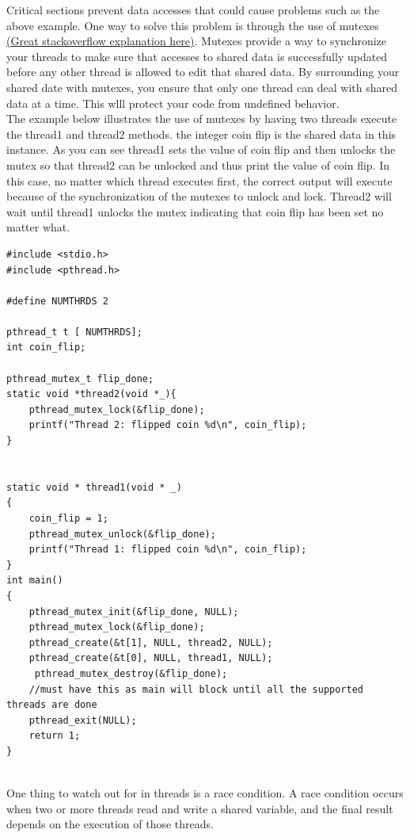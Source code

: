 Critical sections prevent data accesses that could cause problems such as the above example.  One way to solve this problem is through the use of mutexes \href{http://stackoverflow.com/questions/34524/what-is-a-mutex
}{(Great stackoverflow explanation here)}.  Mutexes provide a way to synchronize your threads to make sure that accesses to shared data is successfully updated before any other thread is allowed to edit that shared data.  By surrounding your shared date with mutexes, you ensure that only one thread can deal with shared data at a time.  This wlll protect your code from undefined behavior.\\

The example below illustrates the use of mutexes by having two threads execute the thread1 and thread2 methods.  the integer coin flip is the shared data in this instance.  As you can see thread1 sets the value of coin flip and then unlocks the mutex so that thread2 can be unlocked and thus print the value of coin flip.  In this case, no matter which thread executes first, the correct output will execute because of the synchronization of the mutexes to unlock and lock.  Thread2 will wait until thread1 unlocks the mutex indicating that coin flip has been set no matter what.

\begin{lstlisting}
#include <stdio.h>
#include <pthread.h>

#define NUMTHRDS 2

pthread_t t [ NUMTHRDS];
int coin_flip;

pthread_mutex_t flip_done;
static void *thread2(void *_){
	pthread_mutex_lock(&flip_done);
	printf("Thread 2: flipped coin %d\n", coin_flip);
}


static void * thread1(void * _)
{
	coin_flip = 1;
	pthread_mutex_unlock(&flip_done);
	printf("Thread 1: flipped coin %d\n", coin_flip);
}
int main()
{
	pthread_mutex_init(&flip_done, NULL);
	pthread_mutex_lock(&flip_done);
	pthread_create(&t[1], NULL, thread2, NULL);
	pthread_create(&t[0], NULL, thread1, NULL);
	 pthread_mutex_destroy(&flip_done);
	//must have this as main will block until all the supported threads are done
	pthread_exit(NULL);
	return 1;
}


\end{lstlisting}


One thing to watch out for in threads is a race condition.  A race condition occurs when two or more threads read and write a shared variable, and the final result depends on the execution of those threads.


